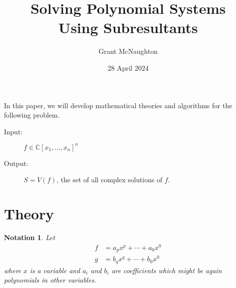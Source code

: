\documentclass{article}%
\newtheorem{notation}[theorem]{Notation}
\begin{document}
\title{Solving Polynomial Systems\\ Using Subresultants}
\author{Grant McNaughton}
\date{28 April 2024}

\maketitle


\noindent In this paper, we will develop mathematical theories and algorithms
for the following problem.

\begin{description}
\item[Input:] $f\in\mathbb{C}\left[  x_{1},\ldots,x_{n}\right]  ^{n}$

\item[Output:] $S=V(f) $, the set of all complex solutions of $f$.
\end{description}

\section{Theory}

\begin{notation}
Let%
\begin{align*}
f  &  =a_{p}x^{p}+\cdots+a_{0}x^{0}\\
g  &  =b_{q}x^{q}+\cdots+b_{0}x^{0}%
\end{align*}
where $x$ is a variable and $a_{i}$ and $b_{i}$ are coefficients which might
be again polynomials in other variables.
\end{notation}
\end{document}
